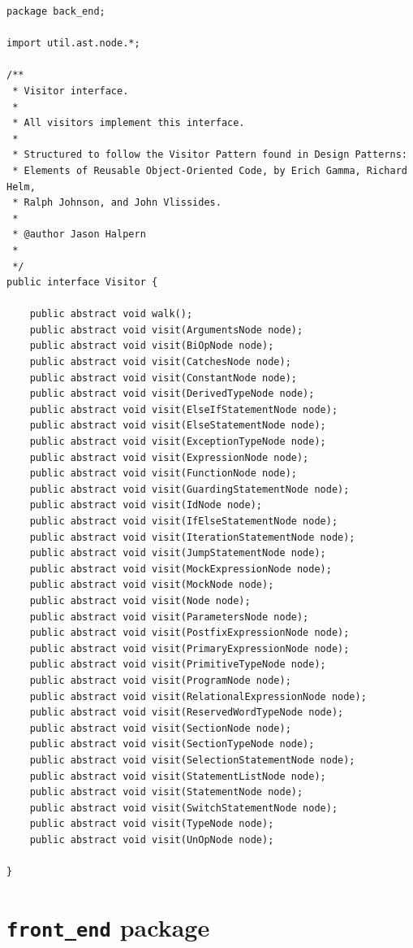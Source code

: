 \documentclass{report}
\begin{document}
\begin{verbatim}
package back_end;

import util.ast.node.*;

/**
 * Visitor interface.
 * 
 * All visitors implement this interface.
 * 
 * Structured to follow the Visitor Pattern found in Design Patterns:
 * Elements of Reusable Object-Oriented Code, by Erich Gamma, Richard Helm,
 * Ralph Johnson, and John Vlissides.
 * 
 * @author Jason Halpern
 *
 */
public interface Visitor {
	
	public abstract void walk();
	public abstract void visit(ArgumentsNode node);
	public abstract void visit(BiOpNode node);
	public abstract void visit(CatchesNode node);
	public abstract void visit(ConstantNode node);
	public abstract void visit(DerivedTypeNode node);
	public abstract void visit(ElseIfStatementNode node);
	public abstract void visit(ElseStatementNode node);
	public abstract void visit(ExceptionTypeNode node);
	public abstract void visit(ExpressionNode node);
	public abstract void visit(FunctionNode node);
	public abstract void visit(GuardingStatementNode node);
	public abstract void visit(IdNode node);
	public abstract void visit(IfElseStatementNode node);
	public abstract void visit(IterationStatementNode node);
	public abstract void visit(JumpStatementNode node);
	public abstract void visit(MockExpressionNode node);
	public abstract void visit(MockNode node);
	public abstract void visit(Node node);
	public abstract void visit(ParametersNode node);
	public abstract void visit(PostfixExpressionNode node);
	public abstract void visit(PrimaryExpressionNode node);
	public abstract void visit(PrimitiveTypeNode node);
	public abstract void visit(ProgramNode node);
	public abstract void visit(RelationalExpressionNode node);
	public abstract void visit(ReservedWordTypeNode node);
	public abstract void visit(SectionNode node);
	public abstract void visit(SectionTypeNode node);
	public abstract void visit(SelectionStatementNode node);
	public abstract void visit(StatementListNode node);
	public abstract void visit(StatementNode node);
	public abstract void visit(SwitchStatementNode node);
	public abstract void visit(TypeNode node);
	public abstract void visit(UnOpNode node);

}
\end{verbatim}

\section{\texttt{front\_end} package}
\end{document}
